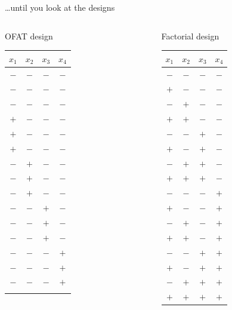 \documentclass[10pt]{beamer}
\newcommand\lo{\ensuremath{\boldsymbol{-}}}
\newcommand\hi{\ensuremath{\boldsymbol{+}}}
\begin{document}
\begin{frame}{\ldots{}until you look at the designs}

\begin{columns}

\begin{column}{0.45\textwidth}
\begin{center}
OFAT design
\begin{tabular}{cccc}
$x_1$ & $x_2$ & $x_3$ & $x_4$ \\
\hline
\lo & \lo & \lo & \lo \\
\lo & \lo & \lo & \lo \\
\lo & \lo & \lo & \lo \\
\hi & \lo & \lo & \lo \\
\hi & \lo & \lo & \lo \\
\hi & \lo & \lo & \lo \\
\lo & \hi & \lo & \lo \\
\lo & \hi & \lo & \lo \\
\lo & \hi & \lo & \lo \\
\lo & \lo & \hi & \lo \\
\lo & \lo & \hi & \lo \\
\lo & \lo & \hi & \lo \\
\lo & \lo & \lo & \hi \\
\lo & \lo & \lo & \hi \\
\lo & \lo & \lo & \hi \\
 \phantom{\lo} & & & \\
\end{tabular}
\end{center}
\end{column}

\begin{column}{0.45\textwidth}
\begin{center}
Factorial design
\begin{tabular}{cccc}
$x_1$ & $x_2$ & $x_3$ & $x_4$ \\
\hline
\lo & \lo & \lo & \lo \\
\hi & \lo & \lo & \lo \\
\lo & \hi & \lo & \lo \\
\hi & \hi & \lo & \lo \\
\lo & \lo & \hi & \lo \\
\hi & \lo & \hi & \lo \\
\lo & \hi & \hi & \lo \\
\hi & \hi & \hi & \lo \\
\lo & \lo & \lo & \hi \\
\hi & \lo & \lo & \hi \\
\lo & \hi & \lo & \hi \\
\hi & \hi & \lo & \hi \\
\lo & \lo & \hi & \hi \\
\hi & \lo & \hi & \hi \\
\lo & \hi & \hi & \hi \\
\hi & \hi & \hi & \hi \\
\end{tabular}
\end{center}
\end{column}


\end{columns}
\end{frame}
\end{document}
